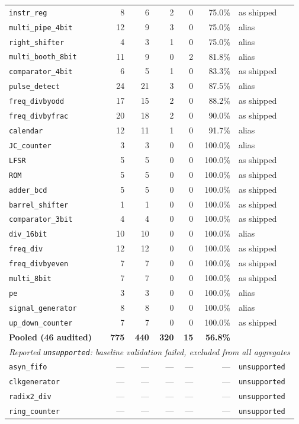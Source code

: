 \begin{tabular}{lrrrrrl}
\texttt{instr\_reg} & 8 & 6 & 2 & 0 & 75.0\% & as shipped \\
\texttt{multi\_pipe\_4bit} & 12 & 9 & 3 & 0 & 75.0\% & alias \\
\texttt{right\_shifter} & 4 & 3 & 1 & 0 & 75.0\% & alias \\
\texttt{multi\_booth\_8bit} & 11 & 9 & 0 & 2 & 81.8\% & alias \\
\texttt{comparator\_4bit} & 6 & 5 & 1 & 0 & 83.3\% & as shipped \\
\texttt{pulse\_detect} & 24 & 21 & 3 & 0 & 87.5\% & alias \\
\texttt{freq\_divbyodd} & 17 & 15 & 2 & 0 & 88.2\% & as shipped \\
\texttt{freq\_divbyfrac} & 20 & 18 & 2 & 0 & 90.0\% & as shipped \\
\texttt{calendar} & 12 & 11 & 1 & 0 & 91.7\% & alias \\
\texttt{JC\_counter} & 3 & 3 & 0 & 0 & 100.0\% & alias \\
\texttt{LFSR} & 5 & 5 & 0 & 0 & 100.0\% & as shipped \\
\texttt{ROM} & 5 & 5 & 0 & 0 & 100.0\% & as shipped \\
\texttt{adder\_bcd} & 5 & 5 & 0 & 0 & 100.0\% & as shipped \\
\texttt{barrel\_shifter} & 1 & 1 & 0 & 0 & 100.0\% & as shipped \\
\texttt{comparator\_3bit} & 4 & 4 & 0 & 0 & 100.0\% & as shipped \\
\texttt{div\_16bit} & 10 & 10 & 0 & 0 & 100.0\% & alias \\
\texttt{freq\_div} & 12 & 12 & 0 & 0 & 100.0\% & as shipped \\
\texttt{freq\_divbyeven} & 7 & 7 & 0 & 0 & 100.0\% & as shipped \\
\texttt{multi\_8bit} & 7 & 7 & 0 & 0 & 100.0\% & as shipped \\
\texttt{pe} & 3 & 3 & 0 & 0 & 100.0\% & alias \\
\texttt{signal\_generator} & 8 & 8 & 0 & 0 & 100.0\% & alias \\
\texttt{up\_down\_counter} & 7 & 7 & 0 & 0 & 100.0\% & as shipped \\
\midrule
\textbf{Pooled (46 audited)} & \textbf{775} & \textbf{440} & \textbf{320} & \textbf{15} & \textbf{56.8\%} & \\
\midrule
\multicolumn{7}{l}{\emph{Reported \texttt{unsupported}: baseline validation failed, excluded from all aggregates}} \\
\texttt{asyn\_fifo} & --- & --- & --- & --- & --- & \texttt{unsupported} \\
\texttt{clkgenerator} & --- & --- & --- & --- & --- & \texttt{unsupported} \\
\texttt{radix2\_div} & --- & --- & --- & --- & --- & \texttt{unsupported} \\
\texttt{ring\_counter} & --- & --- & --- & --- & --- & \texttt{unsupported} \\
\bottomrule
\end{tabular}
